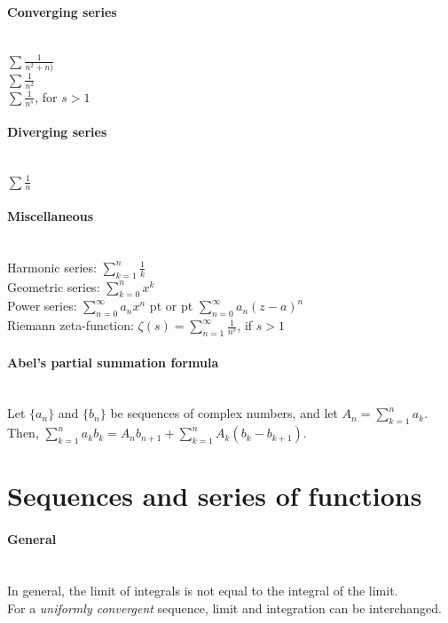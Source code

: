 \documentclass[10pt]{article}
\begin{document}
\paragraph{Converging series}\ \\
$\sum\frac{1}{n^2+n)}$\\
$\sum\frac{1}{n^2}$\\
$\sum\frac{1}{n^s}$, for $s>1$

\paragraph{Diverging series}\ \\
$\sum\frac{1}{n}$

\paragraph{Miscellaneous}\ \\
Harmonic series: $\sum_{k=1}^n \frac{1}{k}$\\
Geometric series: $\sum_{k=0}^n x^k$\\
Power series: $\sum_{n=0}^\infty a_nx^n$  pt or  pt $\sum_{n=0}^\infty a_n(z-a)^n$\\
Riemann zeta-function: $\zeta(s)=\sum_{n=1}^\infty\frac{1}{n^s}$, if $s>1$

\paragraph{Abel's partial summation formula}\ \\
Let $\{a_n\}$ and $\{b_n\}$ be sequences of complex numbers, and let $A_n=\sum_{k=1}^na_k$.
Then, $\sum_{k=1}^na_kb_k=A_nb_{n+1}+\sum_{k=1}^nA_k(b_k-b_{k+1})$.



\bigskip\bigskip
\section{Sequences and series of functions}\smallskip

\paragraph{General}\ \\
In general, the limit of integrals is not equal to the integral of the limit.\\
For a {\it uniformly convergent} sequence, limit and integration can be interchanged.
\end{document}
